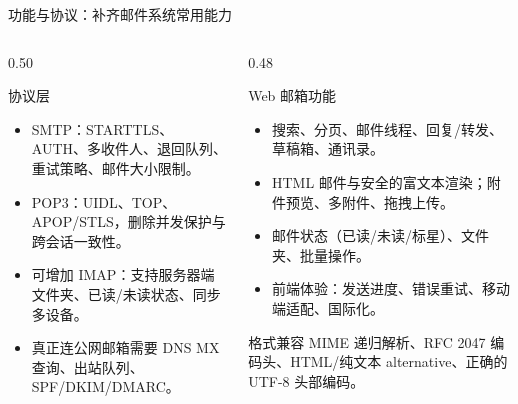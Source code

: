 \documentclass[aspectratio=169,10pt]{beamer}
\begin{document}
\begin{frame}{功能与协议：补齐邮件系统常用能力}
  \begin{columns}[T]
    \begin{column}{0.50\textwidth}
      \begin{block}{协议层}
        \small
        \begin{itemize}
          \item SMTP：STARTTLS、AUTH、多收件人、退回队列、重试策略、邮件大小限制。
          \item POP3：UIDL、TOP、APOP/STLS，删除并发保护与跨会话一致性。
          \item 可增加 IMAP：支持服务器端文件夹、已读/未读状态、同步多设备。
          \item 真正连公网邮箱需要 DNS MX 查询、出站队列、SPF/DKIM/DMARC。
        \end{itemize}
      \end{block}
    \end{column}
    \begin{column}{0.48\textwidth}
      \begin{block}{Web 邮箱功能}
        \small
        \begin{itemize}
          \item 搜索、分页、邮件线程、回复/转发、草稿箱、通讯录。
          \item HTML 邮件与安全的富文本渲染；附件预览、多附件、拖拽上传。
          \item 邮件状态（已读/未读/标星）、文件夹、批量操作。
          \item 前端体验：发送进度、错误重试、移动端适配、国际化。
        \end{itemize}
      \end{block}
      \begin{block}{格式兼容}
        \small
        MIME 递归解析、RFC 2047 编码头、HTML/纯文本 alternative、正确的 UTF-8 头部编码。
      \end{block}
    \end{column}
  \end{columns}
\end{frame}
\end{document}
